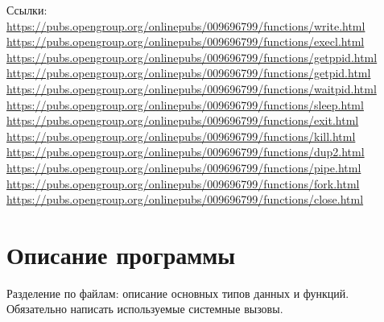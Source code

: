 Ссылки: \\
\url{https://pubs.opengroup.org/onlinepubs/009696799/functions/write.html} \\
\url{https://pubs.opengroup.org/onlinepubs/009696799/functions/execl.html} \\
\url{https://pubs.opengroup.org/onlinepubs/009696799/functions/getppid.html} \\
\url{https://pubs.opengroup.org/onlinepubs/009696799/functions/getpid.html} \\
\url{https://pubs.opengroup.org/onlinepubs/009696799/functions/waitpid.html} \\
\url{https://pubs.opengroup.org/onlinepubs/009696799/functions/sleep.html} \\
\url{https://pubs.opengroup.org/onlinepubs/009696799/functions/exit.html} \\
\url{https://pubs.opengroup.org/onlinepubs/009696799/functions/kill.html} \\
\url{https://pubs.opengroup.org/onlinepubs/009696799/functions/dup2.html} \\ 
\url{https://pubs.opengroup.org/onlinepubs/009696799/functions/pipe.html} \\
\url{https://pubs.opengroup.org/onlinepubs/009696799/functions/fork.html} \\ 
\url{https://pubs.opengroup.org/onlinepubs/009696799/functions/close.html} \\


\section{Описание программы}
Разделение по файлам: описание основных типов данных и функций. Обязательно написать используемые системные вызовы.